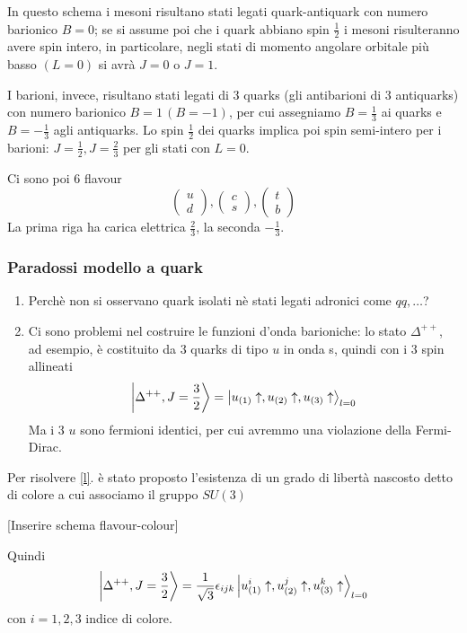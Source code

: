 \documentclass[10pt,a4paper]{article}
\theoremstyle{definition}
\begin{document}
In questo schema i mesoni risultano stati legati quark-antiquark con numero barionico \(B = 0\); se si assume poi che i quark abbiano spin \(\frac12\) i mesoni risulteranno avere spin intero, in particolare, negli stati di momento angolare orbitale più basso \((L = 0)\) si avrà \(J = 0\) o \(J = 1\).

I barioni, invece, risultano stati legati di 3 quarks (gli antibarioni di 3 antiquarks) con numero barionico \(B = 1\, (B = -1)\), per cui assegniamo \(B = \frac13\) ai quarks e \(B = -\frac13\) agli antiquarks. Lo spin \(\frac12\) dei quarks implica poi spin semi-intero per i barioni: \(J = \frac12, J = \frac23\) per gli stati con \(L = 0\).

Ci sono poi 6 flavour
\[
\begin{pmatrix}
u \\ d    
\end{pmatrix}
,
\begin{pmatrix}
    c \\ s
\end{pmatrix}
,
\begin{pmatrix}
    t \\ b 
\end{pmatrix}
\]
La prima riga ha carica elettrica \(\frac23\), la seconda \(-\frac13\).

\subsubsection{Paradossi modello a quark}
\begin{enumerate}
    \item Perchè non si osservano quark isolati nè stati legati adronici come $qq, \dots$? \label{conf}
    \item Ci sono problemi nel costruire le funzioni d'onda barioniche: lo stato \(\Delta^{++}\), ad esempio, è costituito da 3 quarks di tipo \(u\) in onda s, quindi con i 3 spin allineati
    \[
    \ket{\Delta^{++}, J = \frac32} = \ket{u_{(1)}\uparrow, u_{(2)}\uparrow, u_{(3)}\uparrow}_{l = 0} 
    \] 
    Ma i 3 \(u\) sono fermioni identici, per cui avremmo una violazione della Fermi-Dirac. \label{l}
\end{enumerate}
Per risolvere \ref{l}. è stato proposto l'esistenza di un grado di libertà nascosto detto di colore a cui associamo il gruppo $SU(3)$

[Inserire schema flavour-colour]

Quindi 
\[
    \ket{\Delta^{++}, J = \frac32} = \frac{1}{\sqrt{3}}\epsilon_{ijk} \ket{u_{(1)}^i\uparrow, u_{(2)}^j\uparrow, u_{(3)}^k\uparrow}_{l = 0} 
\] 
con \(i = 1, 2, 3\) indice di colore.
\end{document}
